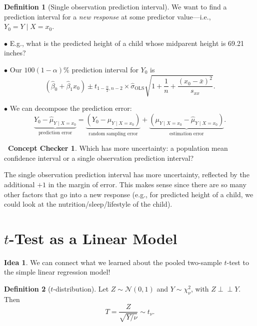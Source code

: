 \documentclass[12pt,oneside]{article}
\newcommand{\indep}{\perp\!\!\!\perp}
\newcommand{\OLS}{\text{OLS}}
\newcommand{\N}{\mathcal{N}}
\theoremstyle{definition}
\newtheorem{definition}{Definition}
\newtheorem{concept}{\faPen \ Concept Checker}
\newtheorem*{idea}{Idea}
\theoremstyle{remark}
\begin{document}
\begin{definition}[Single observation prediction interval]
We want to find a prediction interval for a \textit{new response} at some predictor value—i.e., $Y_0 = Y \mid X = x_0$.

$\bullet$ E.g., what is the predicted height of a child whose midparent height is 69.21 inches?

$\bullet$ Our $100 (1 - \alpha) \%$ prediction interval for $Y_0$ is \[(\hat{\beta}_{0} + \hat{\beta}_{1} x_0) \pm t_{1 - \frac{\alpha}{2}, n - 2} \times \hat{\sigma}_{\OLS} \sqrt{1 + \frac{1}{n} + \frac{(x_0 - \bar{x})^2}{s_{xx}}}.\]

$\bullet$ We can decompose the prediction error: \[\underbrace{Y_0 - \hat{\mu}_{Y \mid X = x_0}}_{\text{prediction error}} = \underbrace{(Y_0 - \mu_{Y \mid X = x_0})}_{\text{random sampling error}} + \underbrace{(\mu_{Y \mid X = x_0} - \hat{\mu}_{Y \mid X = x_0})}_{\text{estimation error}}.\]
\end{definition}

\begin{concept}
Which has more uncertainty: a population mean confidence interval or a single observation prediction interval? 
\end{concept}

\begin{solutionbox}
The single observation prediction interval has more uncertainty, reflected by the additional $+ 1$ in the margin of error. This makes sense since there are so many other factors that go into a new response (e.g., for predicted height of a child, we could look at the nutrition/sleep/lifestyle of the child).
\end{solutionbox}

\section{$t$-Test as a Linear Model}

\begin{idea}
We can connect what we learned about the pooled two-sample $t$-test to the simple linear regression model!
\end{idea}

\begin{definition}[$t$-distribution]
Let $Z \sim \N(0, 1)$ and $Y \sim \chi^{2}_{\nu}$, with $Z \indep Y$. Then \[T = \frac{Z}{\sqrt{Y / \nu}} \sim t_{\nu}.\]
\end{definition}
\end{document}
